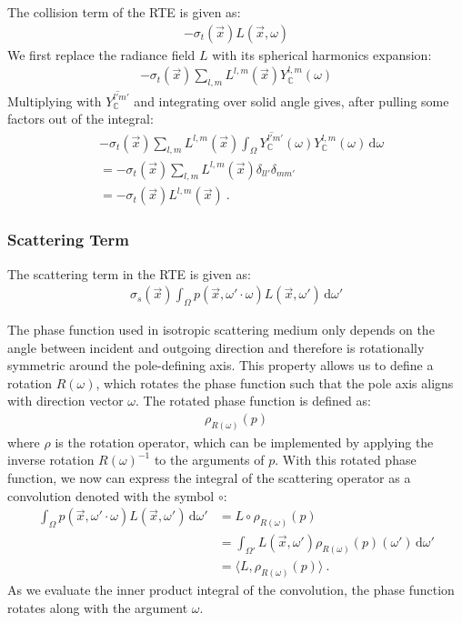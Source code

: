 \documentclass{egpubl}
\newcommand{\ud}{\,\mathrm{d}} %
\newcommand{\SHBC}{Y_{\mathbb{C}}} %
\begin{document}
The collision term of the RTE is given as:
\begin{align*}
-\sigma_t\left(\vec{x}\right)L\left(\vec{x}, \omega\right)
\end{align*}
We first replace the radiance field $L$ with its spherical harmonics expansion:
\begin{align*}
-\sigma_t\left(\vec{x}\right)
\sum_{l,m}
{
L^{l,m}\left(\vec{x}\right )\SHBC^{l,m}\left(\omega\right)
}
\end{align*}
Multiplying with $\overline{\SHBC^{l'm'}}$ and integrating over solid angle gives, after pulling some factors out of the integral:
\begin{align*}
&-\sigma_t\left(\vec{x}\right)\sum_{l,m}{L^{l,m}\left(\vec{x}\right )\int_\Omega\overline{\SHBC^{l'm'}}\left(\omega\right)\SHBC^{l,m}\left(\omega\right)\ud\omega}\\
&= -\sigma_t\left(\vec{x}\right)\sum_{l,m}{L^{l,m}\left(\vec{x}\right )\delta_{ll'}\delta_{mm'}}\\
&= -\sigma_t\left(\vec{x}\right)L^{l,m}\left(\vec{x}\right ) \ .
\end{align*}


\subsubsection{Scattering Term}
\label{sec:complex_scattering_term}

The scattering term in the RTE is given as:
\begin{align*}
\sigma_s(\vec{x})\int_{\Omega}p(\vec{x}, \omega'\cdot\omega)L(\vec{x}, \omega')\ud\omega'
\end{align*}

The phase function used in isotropic scattering medium only depends on the angle between incident and outgoing direction and therefore is rotationally symmetric around the pole-defining axis. This property allows us to define a rotation $R(\omega)$, which rotates the phase function such that the pole axis aligns with direction vector $\omega$. The rotated phase function is defined as:
\begin{align*}
\rho_{R(\omega)}(p)
\end{align*}
where $\rho$ is the rotation operator, which can be implemented by applying the inverse rotation $R(\omega)^{-1}$ to the arguments of $p$. With this rotated phase function, we now can express the integral of the scattering operator as a convolution denoted with the symbol $\circ$:
\begin{align}
\int_{\Omega}p(\vec{x}, \omega'\cdot\omega)L(\vec{x}, \omega')\ud\omega'
&=
L\circ \rho_{R(\omega)}(p) \nonumber\\
&=
\int_{\Omega'}{L(\vec{x}, \omega')\rho_{R(\omega)}(p)(\omega')\ud\omega'} \nonumber\\
&= \langle L,  \rho_{R(\omega)}(p)\rangle \ .
\label{eq:complex_scatt_conv}
\end{align}
As we evaluate the inner product integral of the convolution, the phase function rotates along with the argument $\omega$.
\end{document}
